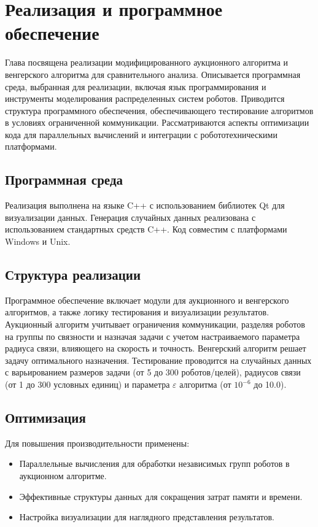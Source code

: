 \chapter{Реализация и программное обеспечение} \label{ch3}

Глава посвящена реализации модифицированного аукционного алгоритма и венгерского алгоритма для сравнительного анализа. Описывается программная среда, выбранная для реализации, включая язык программирования и инструменты моделирования распределенных систем роботов. Приводится структура программного обеспечения, обеспечивающего тестирование алгоритмов в условиях ограниченной коммуникации. Рассматриваются аспекты оптимизации кода для параллельных вычислений и интеграции с робототехническими платформами.

\section{Программная среда}

Реализация выполнена на языке C++ с использованием библиотек Qt для визуализации данных. Генерация случайных данных реализована с использованием стандартных средств C++. Код совместим с платформами Windows и Unix.

\section{Структура реализации}

Программное обеспечение включает модули для аукционного и венгерского алгоритмов, а также логику тестирования и визуализации результатов. Аукционный алгоритм учитывает ограничения коммуникации, разделяя роботов на группы по связности и назначая задачи с учетом настраиваемого параметра радиуса связи, влияющего на скорость и точность. Венгерский алгоритм решает задачу оптимального назначения. Тестирование проводится на случайных данных с варьированием размеров задачи (от 5 до 300 роботов/целей), радиусов связи (от 1 до 300 условных единиц) и параметра $\varepsilon$ алгоритма (от $10^{-6}$ до 10.0).

\section{Оптимизация}

Для повышения производительности применены:
\begin{itemize}
  \item Параллельные вычисления для обработки независимых групп роботов в аукционном алгоритме.
  \item Эффективные структуры данных для сокращения затрат памяти и времени.
  \item Настройка визуализации для наглядного представления результатов.
\end{itemize}

